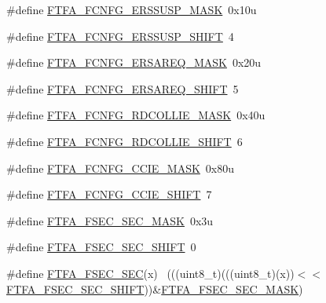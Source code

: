 \begin{DoxyCompactItemize}
\item 
\#define \hyperlink{group___f_t_f_a___register___masks_ga0fc6d10ebdf1a45172f3c8291fdee94c}{F\+T\+F\+A\+\_\+\+F\+C\+N\+F\+G\+\_\+\+E\+R\+S\+S\+U\+S\+P\+\_\+\+M\+A\+SK}~0x10u
\item 
\#define \hyperlink{group___f_t_f_a___register___masks_ga7586fcfe862202cd864fec542db66458}{F\+T\+F\+A\+\_\+\+F\+C\+N\+F\+G\+\_\+\+E\+R\+S\+S\+U\+S\+P\+\_\+\+S\+H\+I\+FT}~4
\item 
\#define \hyperlink{group___f_t_f_a___register___masks_gac92e8d3d354f7352b8bd61086327d16d}{F\+T\+F\+A\+\_\+\+F\+C\+N\+F\+G\+\_\+\+E\+R\+S\+A\+R\+E\+Q\+\_\+\+M\+A\+SK}~0x20u
\item 
\#define \hyperlink{group___f_t_f_a___register___masks_ga0879413588f696dfe9f6a1c849103753}{F\+T\+F\+A\+\_\+\+F\+C\+N\+F\+G\+\_\+\+E\+R\+S\+A\+R\+E\+Q\+\_\+\+S\+H\+I\+FT}~5
\item 
\#define \hyperlink{group___f_t_f_a___register___masks_gae9ad4a9aac7c5ef332e4c7d7af0a63a9}{F\+T\+F\+A\+\_\+\+F\+C\+N\+F\+G\+\_\+\+R\+D\+C\+O\+L\+L\+I\+E\+\_\+\+M\+A\+SK}~0x40u
\item 
\#define \hyperlink{group___f_t_f_a___register___masks_gaea7f60637733465718c684ca9c4612f6}{F\+T\+F\+A\+\_\+\+F\+C\+N\+F\+G\+\_\+\+R\+D\+C\+O\+L\+L\+I\+E\+\_\+\+S\+H\+I\+FT}~6
\item 
\#define \hyperlink{group___f_t_f_a___register___masks_gad7b9ee7d7ca0f897784ed211030e6e8f}{F\+T\+F\+A\+\_\+\+F\+C\+N\+F\+G\+\_\+\+C\+C\+I\+E\+\_\+\+M\+A\+SK}~0x80u
\item 
\#define \hyperlink{group___f_t_f_a___register___masks_ga7032f590fbfc9a43d13109688eb3a4c0}{F\+T\+F\+A\+\_\+\+F\+C\+N\+F\+G\+\_\+\+C\+C\+I\+E\+\_\+\+S\+H\+I\+FT}~7
\item 
\#define \hyperlink{group___f_t_f_a___register___masks_ga3f0ba5e4a511479878b0505bc098ec00}{F\+T\+F\+A\+\_\+\+F\+S\+E\+C\+\_\+\+S\+E\+C\+\_\+\+M\+A\+SK}~0x3u
\item 
\#define \hyperlink{group___f_t_f_a___register___masks_ga0c7032c13efe05ed6c6d86c42beb7a5f}{F\+T\+F\+A\+\_\+\+F\+S\+E\+C\+\_\+\+S\+E\+C\+\_\+\+S\+H\+I\+FT}~0
\item 
\#define \hyperlink{group___f_t_f_a___register___masks_ga32016cb484a6f4d1ed623bb5e7cfea47}{F\+T\+F\+A\+\_\+\+F\+S\+E\+C\+\_\+\+S\+EC}(x)                                              ~(((uint8\+\_\+t)(((uint8\+\_\+t)(x))$<$$<$\hyperlink{group___f_t_f_a___register___masks_ga0c7032c13efe05ed6c6d86c42beb7a5f}{F\+T\+F\+A\+\_\+\+F\+S\+E\+C\+\_\+\+S\+E\+C\+\_\+\+S\+H\+I\+FT}))\&\hyperlink{group___f_t_f_a___register___masks_ga3f0ba5e4a511479878b0505bc098ec00}{F\+T\+F\+A\+\_\+\+F\+S\+E\+C\+\_\+\+S\+E\+C\+\_\+\+M\+A\+SK})
$$
\end{DoxyCompactItemize}
